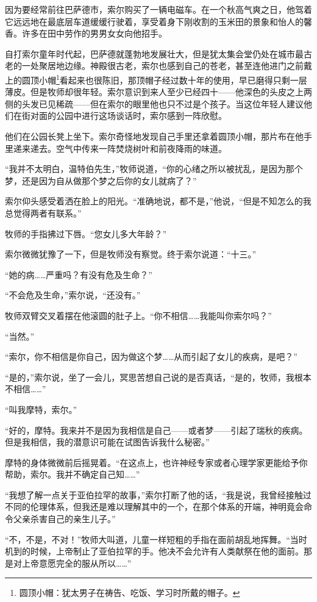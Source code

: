 \documentclass[AutoFakeBold=true]{book}
\begin{document}
因为要经常前往巴萨德市，索尔购买了一辆电磁车。在一个秋高气爽之日，他驾着它远远地在最底层车道缓缓行驶着，享受着身下刚收割的玉米田的景象和怡人的馨香。许多在田中劳作的男男女女向他招手。

自打索尔童年时代起，巴萨德就蓬勃地发展壮大，但是犹太集会堂仍处在城市最古老的一处聚居地边缘。神殿很古老，索尔也感到自己的苍老，甚至连他进门之前戴上的圆顶小帽\footnote{圆顶小帽：犹太男子在祷告、吃饭、学习时所戴的帽子。}看起来也很陈旧，那顶帽子经过数十年的使用，早已磨得只剩一层薄皮。但是牧师却很年轻。索尔意识到来人至少已经四十——他深色的头皮之上两侧的头发已见稀疏——但在索尔的眼里他也只不过是个孩子。当这位年轻人建议他们在街对面的公园中进行这场谈话时，索尔感到一阵欣慰。

他们在公园长凳上坐下。索尔奇怪地发现自己手里还拿着圆顶小帽，那片布在他手里递来递去。空气中传来一阵焚烧树叶和前夜降雨的味道。

``我并不太明白，温特伯先生，''牧师说道，``你的心绪之所以被扰乱，是因为那个梦，还是因为自从做那个梦之后你的女儿就病了？''

索尔仰头感受着洒在脸上的阳光。``准确地说，都不是，''他说，``但是不知怎么的我总觉得两者有联系。''

牧师的手指拂过下唇。``您女儿多大年龄？''

索尔微微犹豫了一下，但是牧师没有察觉。终于索尔说道：``十三。''

``她的病……严重吗？有没有危及生命？''

``不会危及生命，''索尔说，``还没有。''

牧师双臂交叉着摆在他滚圆的肚子上。``你不相信……我能叫你索尔吗？''

``当然。''

``索尔，你不相信是你自己，因为做这个梦……从而引起了女儿的疾病，是吧？''

``是的，''索尔说，坐了一会儿，冥思苦想自己说的是否真话，``是的，牧师，我根本不相信……''

``叫我摩特，索尔。''

``好的，摩特。我来并不是因为我相信是自己——或者梦——引起了瑞秋的疾病。但是我相信，我的潜意识可能在试图告诉我什么秘密。''

摩特的身体微微前后摇晃着。``在这点上，也许神经专家或者心理学家更能给予你帮助，索尔。我并不确定自己知……''

``我想了解一点关于亚伯拉罕的故事，''索尔打断了他的话，``我是说，我曾经接触过不同的伦理体系，但我还是难以理解其中的一个，在那个体系的开端，神明竟会命令父亲杀害自己的亲生儿子。''

``不，不是，不对！''牧师大叫道，儿童一样短粗的手指在面前胡乱地挥舞。``当时机到的时候，上帝制止了亚伯拉罕的手。他决不会允许有人类献祭在他的面前。那是对上帝意愿完全的服从所以……''
\end{document}
